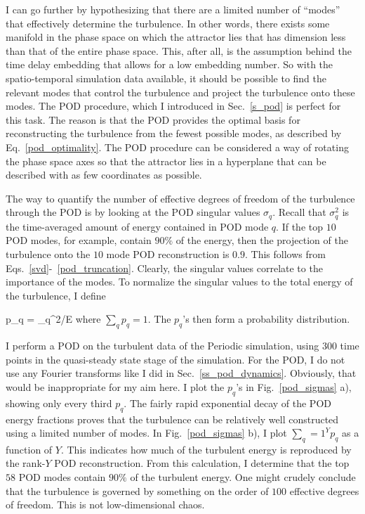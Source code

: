 I can go further by hypothesizing that there are a limited number of ``modes'' that effectively determine the turbulence. 
In other words, there exists some manifold in the phase space on which the attractor lies that has dimension less than that of the entire phase space. This, after all, is the assumption behind
the time delay embedding that allows for a low embedding number. So with the spatio-temporal simulation data available, it should be possible to find the relevant modes that control the turbulence
and project the turbulence onto these modes. The POD procedure, which I introduced in Sec.~\ref{s_pod} is perfect for this task. The reason is that the POD provides the optimal basis for
reconstructing the turbulence from the fewest possible modes, as described by Eq.~\ref{pod_optimality}. The POD procedure can be considered a way of rotating the phase space axes so that
the attractor lies in a hyperplane that can be described with as few coordinates as possible.

The way to quantify the number of effective degrees of freedom of the turbulence through the POD is by looking at the POD singular values $\sigma_q$. Recall that $\sigma_q^2$ is the time-averaged
amount of energy contained in POD mode $q$. If the top $10$ POD modes, for example, contain $90\%$ of the energy, then the projection of the turbulence onto the $10$ mode POD reconstruction
is $0.9$. This follows from Eqs.~\ref{svd}-~\ref{pod_truncation}. Clearly, the singular values correlate to the importance of the modes. To normalize the singular values to the total energy
of the turbulence, I define

\beq
\label{pj_def}
p_q = \sigma_q^2/E
\eeq
where $\sum_q p_q = 1$. The $p_q$'s then form a probability distribution. 

I perform a POD on the turbulent data of the Periodic simulation, using $300$ time points in the quasi-steady state stage of the simulation. 
For the POD, I do not use any Fourier transforms like I did in Sec.~\ref{ss_pod_dynamics}. Obviously, that would be inappropriate for my aim here.
I plot the $p_q$'s in Fig.~\ref{pod_sigmas} a), showing only every third $p_q$. The fairly rapid exponential decay of the POD energy fractions proves that the turbulence can be relatively well constructed
using a limited number of modes. In Fig.~\ref{pod_sigmas} b), I plot $\sum_q=1^Y p_q$ as a function of $Y$. This indicates how much of the turbulent energy is reproduced by the rank-$Y$ POD
reconstruction. From this calculation, I determine that the top $58$ POD modes contain $90\%$ of the turbulent energy. One might crudely conclude that the turbulence is governed by something
on the order of $100$ effective degrees of freedom. This is not low-dimensional chaos.


